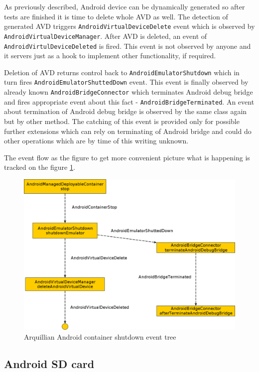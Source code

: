 \documentclass[12pt,final,oneside]{fithesis}
\begin{document}
As previously described, Android device can be dynamically generated so after tests are finished it is time to delete whole AVD as well. The detection of generated AVD triggers \texttt{AndroidVirtualDeviceDelete} event which is observed by \texttt{AndroidVirtualDeviceManager}. After AVD is deleted, an event of \texttt{AndroidVirtulDeviceDeleted} is fired. This event is not observed by anyone and it servers just as a hook to implement other functionality, if required.

Deletion of AVD returns control back to \texttt{AndroidEmulatorShutdown} which in turn fires \texttt{AndroidEmulatorShuttedDown} event. This event is finally observed by already known \texttt{AndroidBridgeConnector} which terminates Android debug bridge and fires appropriate event about this fact - \texttt{AndroidBridgeTerminated}. An event about termination of Android debug bridge is observed by the same class again but by other method. The catching of this event is provided only for possible further extensions which can rely on terminating of Android bridge and could do other operations which are by time of this writing unknown.

The event flow as the figure to get more convenient picture what is happening is tracked on the figure \ref{fig:container_shutdown}.

\begin{figure}[!ht]
	\centering
	\includegraphics[width=120mm]{img/container-shutdown.png}
	\caption{Arquillian Android container shutdown event tree}
	\label{fig:container_shutdown}
\end{figure}

\newpage

		\subsection{Android SD card}
	
\end{document}

